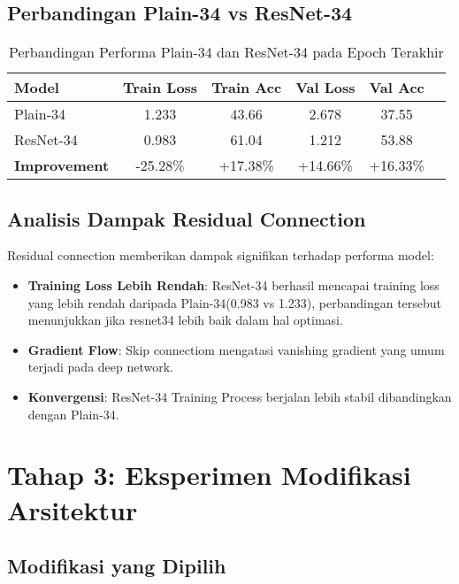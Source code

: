 \documentclass[11pt,a4paper]{article}
\begin{document}
\subsection{Perbandingan Plain-34 vs ResNet-34}

\begin{table}[H]
\centering
\caption{Perbandingan Performa Plain-34 dan ResNet-34 pada Epoch Terakhir}
\label{tab:comparison}
\begin{tabular}{lccccc}
\toprule
\textbf{Model} & \textbf{Train Loss} & \textbf{Train Acc} & \textbf{Val Loss} & \textbf{Val Acc} \\
\midrule
Plain-34 & 1.233 & 43.66 & 2.678  &  37.55 \\
ResNet-34 & 0.983 & 61.04 &  1.212 & 53.88 \\
\midrule
\textbf{Improvement} & -25.28\% & +17.38\% & +14.66\% & +16.33\% \\
\bottomrule
\end{tabular}
\end{table}

\subsection{Analisis Dampak Residual Connection}

Residual connection memberikan dampak signifikan terhadap performa model:

\begin{itemize}
    \item \textbf{Training Loss Lebih Rendah}: ResNet-34 berhasil mencapai training loss yang lebih rendah daripada Plain-34(0.983 vs 1.233), perbandingan tersebut menunjukkan jika resnet34 lebih baik dalam hal optimasi.
    
    \item \textbf{Gradient Flow}: Skip connectiom mengatasi vanishing gradient yang umum terjadi pada deep network.
    
    \item \textbf{Konvergensi}: ResNet-34 Training Process berjalan lebih stabil  dibandingkan dengan Plain-34.
\end{itemize}

\section{Tahap 3: Eksperimen Modifikasi Arsitektur}

\subsection{Modifikasi yang Dipilih}
\end{document}
